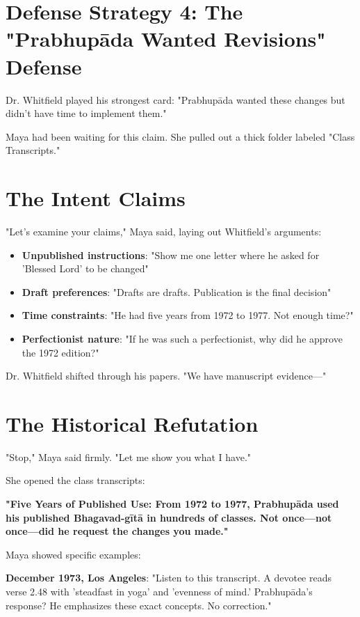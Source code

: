 \documentclass[11pt,twoside]{book}
\begin{document}
\section*{Defense Strategy 4: The "Prabhupāda Wanted Revisions" Defense}
\label{sec:org7319810}

Dr. Whitfield played his strongest card: "Prabhupāda wanted these changes but didn't have time to implement them."

Maya had been waiting for this claim. She pulled out a thick folder labeled "Class Transcripts."
\section*{The Intent Claims}
\label{sec:org4d5a2f1}

"Let's examine your claims," Maya said, laying out Whitfield's arguments:

\begin{itemize}
\item \textbf{\textbf{Unpublished instructions}}: "Show me one letter where he asked for 'Blessed Lord' to be changed"
\item \textbf{\textbf{Draft preferences}}: "Drafts are drafts. Publication is the final decision"
\item \textbf{\textbf{Time constraints}}: "He had five years from 1972 to 1977. Not enough time?"
\item \textbf{\textbf{Perfectionist nature}}: "If he was such a perfectionist, why did he approve the 1972 edition?"
\end{itemize}

Dr. Whitfield shifted through his papers. "We have manuscript evidence—"
\section*{The Historical Refutation}
\label{sec:org4b4923e}

"Stop," Maya said firmly. "Let me show you what I have."

She opened the class transcripts:

\textbf{\textbf{"Five Years of Published Use: From 1972 to 1977, Prabhupāda used his published Bhagavad-gītā in hundreds of classes. Not once—not once—did he request the changes you made."}}

Maya showed specific examples:

\textbf{\textbf{December 1973, Los Angeles}}: "Listen to this transcript. A devotee reads verse 2.48 with 'steadfast in yoga' and 'evenness of mind.' Prabhupāda's response? He emphasizes these exact concepts. No correction."
\end{document}
